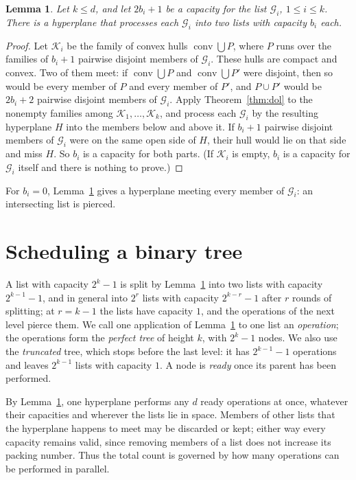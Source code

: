 \documentclass[11pt]{amsart}
\newtheorem{lemma}[theorem]{Lemma}
\theoremstyle{remark}
\newcommand{\G}{\mathcal G}
\begin{document}
\begin{lemma}\label{lem:simul}
Let $k\le d$, and let $2b_i+1$ be a capacity for the list $\G_i$, $1\le i\le k$. There is a hyperplane that processes
each $\G_i$ into two lists with capacity $b_i$ each.
\end{lemma}

\begin{proof}
Let $\mathcal K_i$ be the family of convex hulls $\operatorname{conv}\bigcup P$, where $P$ runs over the families of
$b_i+1$ pairwise disjoint members of $\G_i$. These hulls are compact and convex. Two of them meet: if
$\operatorname{conv}\bigcup P$ and $\operatorname{conv}\bigcup P'$ were disjoint, then so would be every member of $P$
and every member of $P'$, and $P\cup P'$ would be $2b_i+2$ pairwise disjoint members of $\G_i$. Apply
Theorem~\ref{thm:dol} to the nonempty families among $\mathcal K_1,\dots,\mathcal K_k$, and process each $\G_i$ by the
resulting hyperplane $H$ into the members below and above it. If $b_i+1$ pairwise disjoint members of $\G_i$ were on
the same open side of $H$, their hull would lie on that side and miss $H$. So $b_i$ is a capacity for both parts. (If
$\mathcal K_i$ is empty, $b_i$ is a capacity for $\G_i$ itself and there is nothing to prove.)
\end{proof}

For $b_i=0$, Lemma~\ref{lem:simul} gives a hyperplane meeting every member of $\G_i$: an intersecting list is pierced.

\section{Scheduling a binary tree}\label{sec:schedule}

A list with capacity $2^k-1$ is split by Lemma~\ref{lem:simul} into two lists with capacity $2^{k-1}-1$, and in
general into $2^r$ lists with capacity $2^{k-r}-1$ after $r$ rounds of splitting; at $r=k-1$ the lists have capacity
$1$, and the operations of the next level pierce them. We call one application of
Lemma~\ref{lem:simul} to one list an \emph{operation}; the operations form the \emph{perfect tree} of height $k$, with
$2^k-1$ nodes. We also use the \emph{truncated} tree, which stops before the last level: it has $2^{k-1}-1$ operations
and leaves $2^{k-1}$ lists with capacity $1$. A node is \emph{ready} once its parent has been performed.

By Lemma~\ref{lem:simul}, one hyperplane performs any $d$ ready operations at once, whatever their capacities and
wherever the lists lie in space. Members of other lists that the hyperplane happens to meet may be discarded or kept;
either way every capacity remains valid, since removing members of a list does not increase its packing number. Thus
the total count is governed by how many operations can be performed in parallel.
\end{document}
